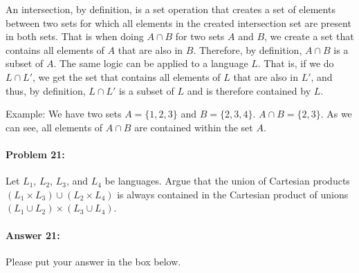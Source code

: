 \documentclass[10pt]{article}
\newenvironment{AnswerBox}{\begin{mdframed}[style=simple]}{\end{mdframed}}
\begin{document}
\begin{AnswerBox}%


  An intersection, by definition, is a set operation that  creates a set of elements between two sets for which all elements in the created intersection set are present in both sets. That is when doing $A \cap B$ for two sets $A$ and $B$, we create a set that contains all elements of $A$ that are also in $B$. Therefore, by definition, $A \cap B$ is a subset of $A$. The same logic can be applied to a language $L$. That is, if we do $L \cap L'$, we get the set that contains all elements of $L$ that are also in $L'$, and thus, by definition, $L \cap L'$ is a subset of $L$ and is therefore contained by $L$.

Example: We have two sets $A = \{1, 2, 3\}$ and $B = \{ 2, 3, 4\}$. $A \cap B = \{2, 3\}$. As we can see, all elements of $A \cap B$ are contained within the set $A$.

\end{AnswerBox}%

\noindent\hrulefill %

\paragraph{Problem 21:}
Let $L_1$, $L_2$, $L_3$, and $L_4$ be languages. Argue that the union of
Cartesian products $(L_1 \times L_3) \cup (L_2 \times L_4)$ is always contained
in the Cartesian product of unions $(L_1 \cup L_2) \times (L_3 \cup L_4)$.

\paragraph{Answer 21:} Please put your answer in the box below.
\end{document}
